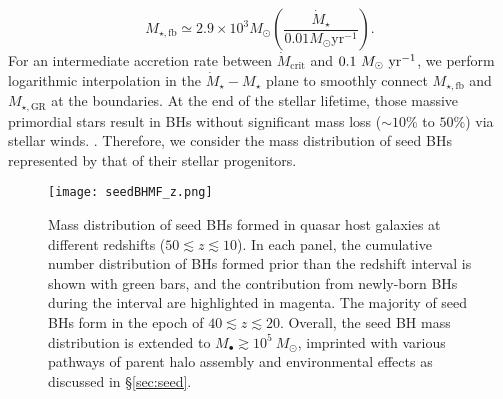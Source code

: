 \documentclass[twocolumn, twocolappendix]{aastex63}
\newcommand{\Msun}{M_\odot}
\newcommand{\Msunyr}{M_\odot~{\rm yr}^{-1}}
\newcommand{\Mdot}{\dot{M}}
\begin{document}
\begin{CJK*}{UTF8}{gbsn}
%
\begin{equation}
M_{\star, \mathrm{fb}} \simeq 2.9 \times 10^{3} \Msun\left(\frac{\dot{M}_{\star}}{0.01 M_{\odot} \mathrm{yr}^{-1}}\right).
\end{equation}
%
For an intermediate accretion rate between $\Mdot_\mathrm{crit}$ and $0.1~\Msunyr$, 
we perform logarithmic interpolation in the $\Mdot_\star - M_\star$ plane to smoothly connect 
$M_{\star, \mathrm{fb}}$ and $M_{\star, \mathrm{GR}}$ at the boundaries.
At the end of the stellar lifetime, those massive primordial stars result in BHs without significant mass loss 
($\sim 10\%$ to $50\%$) via stellar winds.
\citep{2003ApJ...591..288H,2010ApJ...714.1217B,2015MNRAS.451.4086S}.
Therefore, we consider the mass distribution of seed BHs represented by that of their stellar progenitors. 


\begin{figure*}
\centering
\texttt{[image: seedBHMF\_z.png]}
\caption{
Mass distribution of seed BHs formed in quasar host galaxies at different redshifts ($50\lesssim z \lesssim 10$).
In each panel, the cumulative number distribution of BHs formed prior than the redshift interval is shown with green bars,
and the contribution from newly-born BHs during the interval are highlighted in magenta.
The majority of seed BHs form in the epoch of $40\lesssim z \lesssim 20$.
Overall, the seed BH mass distribution is extended to $M_\bullet \gtrsim 10^5~\Msun$, 
imprinted with various pathways of parent halo assembly and environmental effects as discussed in \S\ref{sec:seed}.
}
\label{fig:seedmf}
\end{figure*}



\end{CJK*}
\end{document}
